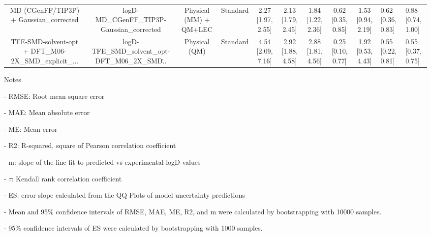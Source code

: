 \documentclass{article}
\begin{document}
\begin{center}
\begin{longtable}{|ccccccccc|}
            MD (CGenFF/TIP3P) + Gaussian_corrected &         logD-MD\_CGenFF\_TIP3P-Gaussian\_corrected &  Physical (MM) + QM+LEC &   Standard &  2.27 [1.97, 2.55] &  2.13 [1.79, 2.45] &     1.84 [1.22, 2.36] &  0.62 [0.35, 0.85] &  1.53 [0.94, 2.19] &   0.62 [0.36, 0.83] &   0.88 [0.74, 1.00] \\
 TFE-SMD-solvent-opt + DFT_M06-2X_SMD_explicit_... &  logD-TFE\_SMD\_solvent\_opt-DFT\_M06\_2X\_SMD\... &           Physical (QM) &   Standard &  4.54 [2.09, 7.16] &  2.92 [1.88, 4.58] &     2.88 [1.81, 4.56] &  0.25 [0.10, 0.77] &  1.92 [0.53, 4.43] &   0.55 [0.22, 0.81] &   0.55 [0.37, 0.75] \\
\end{longtable}
\end{center}

Notes

- RMSE: Root mean square error

- MAE: Mean absolute error

- ME: Mean error

- R2: R-squared, square of Pearson correlation coefficient

- m: slope of the line fit to predicted vs experimental logD values

- $\tau$:  Kendall rank correlation coefficient

- ES: error slope calculated from the QQ Plots of model uncertainty predictions

- Mean and 95\% confidence intervals of RMSE, MAE, ME, R2, and m were calculated by bootstrapping with 10000 samples.

- 95\% confidence intervals of ES were calculated by bootstrapping with 1000 samples.\end{document}
\end{document}
